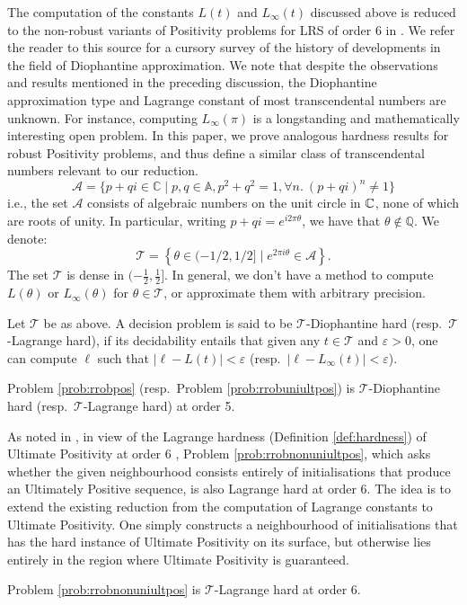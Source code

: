The computation of the constants $L(t)$ and $L_\infty(t)$ discussed above is reduced to the non-robust variants of Positivity problems for LRS of order 6 in \cite[Section 5]{joeljames3}. We refer the reader to this source for a cursory survey of the history of developments in the field of Diophantine approximation. We note that despite the observations and results mentioned in the preceding discussion, the Diophantine approximation type and Lagrange constant of most transcendental numbers are unknown. For instance, computing $L_\infty(\pi)$ is a longstanding and mathematically interesting open problem. In this paper, we prove analogous hardness results for robust Positivity problems, and thus define a similar class of transcendental numbers relevant to our reduction.
\begin{equation}
\mathcal A=\{p+q i \in \mathbb{C} \mid p,q \in \mathbb{A}, p^2+q^2=1, \forall n.~(p + qi)^n \ne 1\}
\end{equation}
i.e., the set $\mathcal A$ consists of algebraic numbers on the unit circle in $\mathbb{C}$, none of which are roots of unity. In particular, writing $p+q i= e^{i 2 \pi \theta}$, we have that $\theta \notin \mathbb{Q}$. We denote:
\begin{equation}
\label{eq:keyset}
\mathcal{T} = \left\{ \theta \in (- 1/2, 1/2] \mid e^{2 \pi i \theta} \in \mathcal{A}\right\}.
\end{equation}
The set $\mathcal{T}$ is dense in $(- \frac 1 2, \frac 1 2]$. In general, we don't have a method to compute $L(\theta)$ or $L_\infty(\theta)$ for $\theta \in \mathcal{T}$, or approximate them with arbitrary precision.

\begin{definition}
\label{def:hardness}
Let $\mathcal{T}$ be as above. A decision problem is said to be $\mathcal{T}$-Diophantine hard (resp.\ $\mathcal{T}$-Lagrange hard), if its decidability entails that given any $t \in \mathcal{T}$ and $\varepsilon > 0$, one can compute $\ell$ such that $|\ell - L(t)| < \varepsilon$ (resp.\  $|\ell - L_\infty(t)| < \varepsilon$).
\end{definition}

\begin{theorem}
\label{thm:hardness}
Problem \ref{prob:rrobpos} (resp.\ Problem \ref{prob:rrobuniultpos}) is $\mathcal{T}$-Diophantine hard (resp.\ $\mathcal{T}$-Lagrange hard) at order 5. 
\end{theorem}

As noted in \cite{originalarxiv}, in view of the Lagrange hardness (Definition \ref{def:hardness}) of Ultimate Positivity at order 6 \cite{joeljames3}, Problem \ref{prob:rrobnonuniultpos}, which asks whether the given neighbourhood consists entirely of initialisations that produce an Ultimately Positive sequence, is also Lagrange hard at order 6. The idea is to extend the existing reduction from the computation of Lagrange constants to Ultimate Positivity. One simply constructs a neighbourhood of initialisations that has the hard instance of Ultimate Positivity on its surface, but otherwise lies entirely in the region where Ultimate Positivity is guaranteed.

\begin{theorem}
\label{thm:hardness2}
Problem \ref{prob:rrobnonuniultpos} is $\mathcal{T}$-Lagrange hard at order 6. 
\end{theorem}